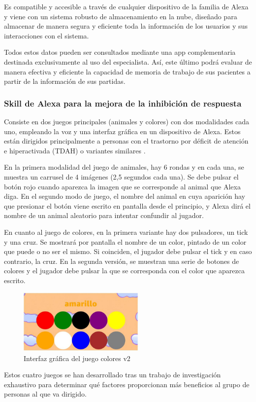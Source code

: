 Es compatible y accesible a través de cualquier dispositivo de la familia de Alexa y viene con un sistema robusto de almacenamiento en la nube, diseñado para almacenar de manera segura y eficiente toda la información de los usuarios y sus interacciones con el sistema.

Todos estos datos pueden ser consultados mediante una app complementaria destinada exclusivamente al uso del especialista. Así, este último podrá evaluar de manera efectiva y eficiente la capacidad de memoria de trabajo de sus pacientes a partir de la información de sus partidas.

\subsubsection{Skill de Alexa para la mejora de la inhibición de respuesta}

Consiste en dos juegos principales (animales y colores) con dos modalidades cada uno, empleando la voz y una interfaz gráfica en un dispositivo de Alexa. Estos están dirigidos principalmente a personas con el trastorno por déficit de atención e hiperactivada (TDAH) o variantes similares \parencite{tfgAlexa1}.

En la primera modalidad del juego de animales, hay 6 rondas y en cada una, se muestra un carrusel de 4 imágenes (2,5 segundos cada una). Se debe pulsar el botón rojo cuando aparezca la imagen que se corresponde al animal que Alexa diga. En el segundo modo de juego, el nombre del animal en cuya aparición hay que presionar el botón viene escrito en pantalla desde el principio, y Alexa dirá el nombre de un animal aleatorio para intentar confundir al jugador.

En cuanto al juego de colores, en la primera variante hay dos pulsadores, un tick y una cruz. Se mostrará por pantalla el nombre de un color, pintado de un color que puede o no ser el mismo. Si coinciden, el jugador debe pulsar el tick y en caso contrario, la cruz. En la segunda versión, se muestran una serie de botones de colores y el jugador debe pulsar la que se corresponda con el color que aparezca escrito.

\begin{figure}[ht]
    \centering
    \includegraphics[width=0.55\textwidth]{imgs/mockupTFG1.JPG}
    \caption{Interfaz gráfica del juego colores v2}
    \label{fig:mockupTFG1}
\end{figure}

Estos cuatro juegos se han desarrollado tras un trabajo de investigación exhaustivo para determinar qué factores proporcionan más beneficios al grupo de personas al que va dirigido.
